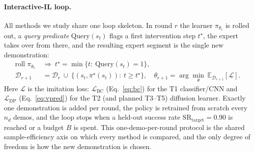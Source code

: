 \documentclass[letterpaper]{article} %
\begin{document}
\paragraph{Interactive-IL loop.}
All methods we study share one loop skeleton. In round $r$ the learner
$\pi_{\theta_r}$ is rolled out, a \emph{query predicate} $\mathrm{Query}(s_t)$
flags a first intervention step $t^\star$, the expert takes over from there, and
the resulting expert segment is the single new demonstration:
\begin{align}
\text{roll } \pi_{\theta_r}\ &\Rightarrow\ t^\star=\min\{t:\ \mathrm{Query}(s_t)=1\}, \nonumber\\
\mathcal{D}_{r+1}&=\mathcal{D}_r\ \cup\ \big\{(s_t,\pi^\star(s_t)):\ t\ge t^\star\big\},\quad
\theta_{r+1}=\arg\min_{\theta}\ \mathbb{E}_{\mathcal{D}_{r+1}}[\mathcal{L}].
\label{eq:iil-loop}
\end{align}
Here $\mathcal{L}$ is the imitation loss: $\mathcal{L}_{\mathrm{BC}}$
(Eq.~\ref{eq:bc}) for the T1 classifier/CNN and $\mathcal{L}_{\mathrm{DP}}$
(Eq.~\ref{eq:vpred}) for the T2 (and planned T3--T5) diffusion learner. Exactly one
demonstration is added per round, the policy is retrained from scratch every $n_d$
demos, and the loop stops when a held-out success rate
$\mathrm{SR}_{\mathrm{target}}=0.90$ is reached or a budget $B$ is spent. This
one-demo-per-round protocol is the shared sample-efficiency axis on which every
method is compared, and the only degree of freedom is how the new demonstration is
chosen.
\end{document}

